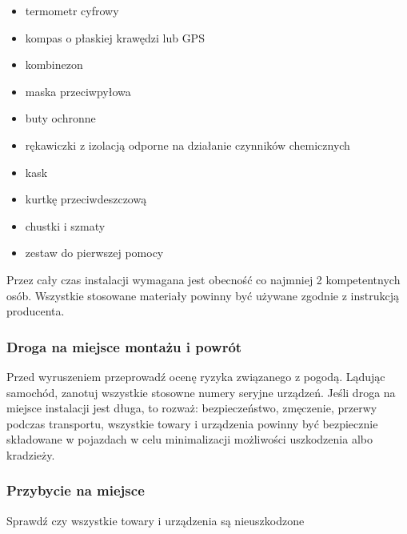 \documentclass[12pt,a4paper]{article}
\begin{document}
\begin{itemize}
\item termometr cyfrowy 
\item kompas o płaskiej krawędzi lub GPS 
\item kombinezon 
\item maska przeciwpyłowa 
\item buty ochronne 
\item rękawiczki z izolacją odporne na działanie czynników chemicznych 
\item kask 
\item kurtkę przeciwdeszczową 
\item chustki i szmaty 
\item zestaw do pierwszej pomocy 
\end{itemize}
Przez cały czas instalacji wymagana jest obecność co najmniej 2 
kompetentnych osób. Wszystkie stosowane materiały powinny być używane 
zgodnie z instrukcją producenta. 

 

\subsubsection{Droga na miejsce montażu i powrót }


Przed wyruszeniem przeprowadź ocenę ryzyka związanego z pogodą. Lądując 
samochód, zanotuj wszystkie stosowne numery seryjne urządzeń. Jeśli 
droga na miejsce instalacji jest długa, to rozważ: bezpieczeństwo, 
zmęczenie, przerwy podczas transportu, wszystkie towary i urządzenia 
powinny być bezpiecznie składowane w pojazdach w celu minimalizacji 
możliwości uszkodzenia albo kradzieży. 

 

\subsubsection{Przybycie na miejsce }


Sprawdź czy wszystkie towary i urządzenia są nieuszkodzone 
\end{document}
